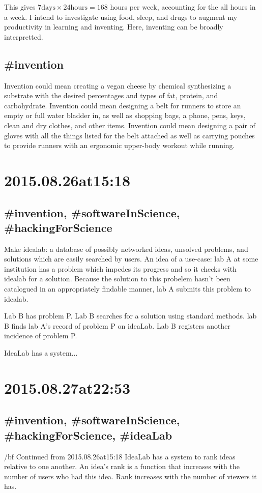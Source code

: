This gives $7 \text{days} \times 24 \text{hours} = 168$ hours per week, accounting for the all hours in a week. I intend to investigate using food, sleep, and drugs to augment my productivity in learning and inventing. Here, inventing can be broadly interpretted.

\subsection*{\#invention}
Invention could mean creating a vegan cheese by chemical synthesizing a substrate with the desired percentages and types of fat, protein, and carbohydrate. Invention could mean designing a belt for runners to store an empty or full water bladder in, as well as shopping bags, a phone, pens, keys, clean and dry clothes, and other items. Invention could mean designing a pair of gloves with all the things listed for the belt attached as well as carrying pouches to provide runners with an ergonomic upper-body workout while running.

\section*{2015.08.26at15:18}
\subsection*{\#invention, \#softwareInScience, \#hackingForScience}
Make idealab: a database of possibly networked ideas, unsolved problems, and solutions which are easily searched by users. An idea of a use-case: lab A at some institution has a problem which impedes its progress and so it checks with idealab for a solution. Because the solution to this probelem hasn't been catalogued in an appropriately findable manner, lab A submits this problem to idealab.

Lab B has problem P. Lab B searches for a solution using standard methods. lab B finds lab A's record of problem P on ideaLab. Lab B registers another incidence of problem P.

IdeaLab has a system...

\section*{2015.08.27at22:53}
\subsection*{\#invention, \#softwareInScience, \#hackingForScience, \#ideaLab}
{/bf Continued from 2015.08.26at15:18}
IdeaLab has a system to rank ideas relative to one another. An idea's rank is a function that increases with the number of users who had this idea. Rank increases with the number of viewers it has.

